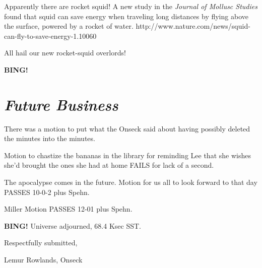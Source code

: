 \documentclass[10pt]{article}
\newcommand{\bing}{{\bf BING!} }
\newcommand{\goto}[1]{\bing \vskip 12pt \section*{{\em{#1}}}}
\newcommand{\ps}{ plus Spehn\xspace}
\newcommand{\onseck}{Lemur Rowlands, Onseck}
\begin{document}
Apparently there are rocket squid!  A new study in the
\emph{Journal of Mollusc Studies} found that squid can save energy
when traveling long distances by flying above the surface, powered
by a rocket of water.  http://www.nature.com/news/squid-can-fly-to-save-energy-1.10060

All hail our new rocket-squid overlords!


\goto{Future Business}

There was a motion to put what the Onseck said about having
possibly deleted the minutes into the minutes.

Motion to chastize the bananas in the library for reminding
Lee that she wishes she'd brought the ones she had at home
FAILS for lack of a second.

The apocalypse comes in the future.  Motion for us all to look 
forward to that day PASSES 10-0-2\ps.

Miller Motion PASSES 12-01\ps.

\bing
\noindent
Universe adjourned, 68.4 Ksec SST.

\vspace{18pt}

\centerline{Respectfully submitted,}
\centerline{\onseck}
\end{document}
